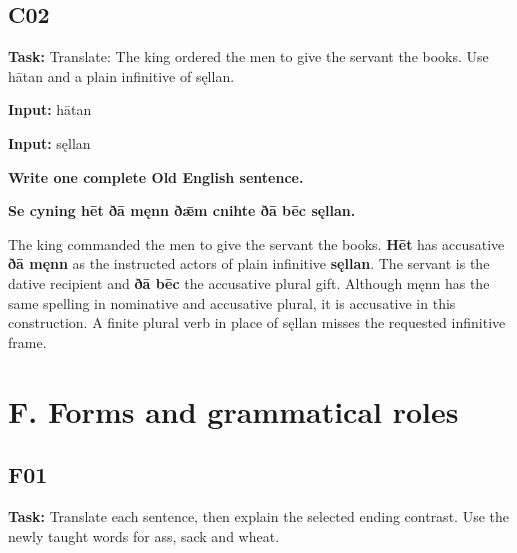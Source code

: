 \subsection*{C02}

\textbf{Task:} Translate: The king ordered the men to give the servant the books. Use hātan and a plain infinitive of sęllan.

\textbf{Input:} hātan

\textbf{Input:} sęllan

\par\begin{minipage}{\linewidth}\raggedright
\textbf{Write one complete Old English sentence.}

\textbf{Se cyning hēt ðā męnn ðǣm cnihte ðā bēc sęllan.}
\end{minipage}\par

The king commanded the men to give the servant the books. \textbf{Hēt} has accusative \textbf{ðā męnn} as the instructed actors of plain infinitive \textbf{sęllan}. The servant is the dative recipient and \textbf{ðā bēc} the accusative plural gift. Although męnn has the same spelling in nominative and accusative plural, it is accusative in this construction. A finite plural verb in place of sęllan misses the requested infinitive frame.

\clearpage
\section*{F. Forms and grammatical roles}

\subsection*{F01}

\textbf{Task:} Translate each sentence, then explain the selected ending contrast. Use the newly taught words for ass, sack and wheat.

